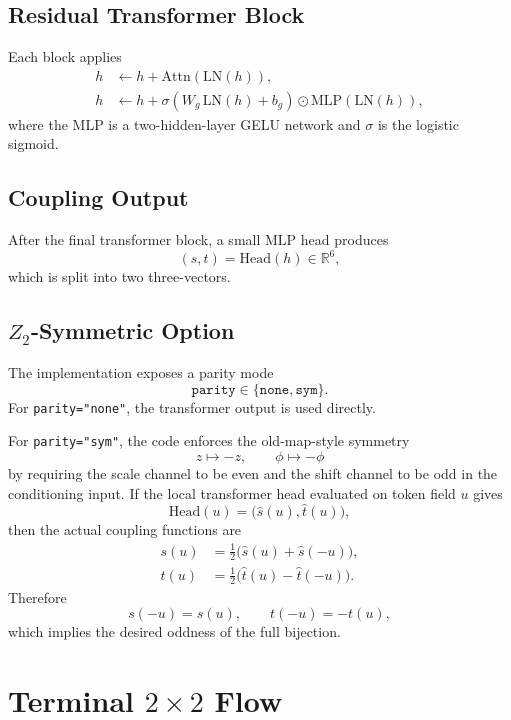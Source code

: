 \documentclass[11pt]{article}
\begin{document}
\subsection{Residual Transformer Block}

Each block applies
\begin{align}
h &\leftarrow h + \mathrm{Attn}(\mathrm{LN}(h)), \\
h &\leftarrow h + \sigma(W_g\,\mathrm{LN}(h)+b_g)\odot
\mathrm{MLP}(\mathrm{LN}(h)),
\end{align}
where the MLP is a two-hidden-layer GELU network and $\sigma$ is the logistic
sigmoid.

\subsection{Coupling Output}

After the final transformer block, a small MLP head produces
\begin{equation}
(s,t)=\mathrm{Head}(h)\in\mathbb{R}^6,
\end{equation}
which is split into two three-vectors.

\subsection{$Z_2$-Symmetric Option}

The implementation exposes a parity mode
\[
\texttt{parity}\in\{\texttt{none},\texttt{sym}\}.
\]
For \texttt{parity="none"}, the transformer output is used directly.

For \texttt{parity="sym"}, the code enforces the old-map-style symmetry
\[
z\mapsto -z,\qquad \phi\mapsto -\phi
\]
by requiring the scale channel to be even and the shift channel to be odd in
the conditioning input. If the local transformer head evaluated on token field
$u$ gives
\[
\mathrm{Head}(u)=\bigl(\hat s(u),\hat t(u)\bigr),
\]
then the actual coupling functions are
\begin{align}
s(u) &= \frac12\bigl(\hat s(u)+\hat s(-u)\bigr), \\
t(u) &= \frac12\bigl(\hat t(u)-\hat t(-u)\bigr).
\end{align}
Therefore
\[
s(-u)=s(u),\qquad t(-u)=-t(u),
\]
which implies the desired oddness of the full bijection.

\section{Terminal $2\times 2$ Flow}
\end{document}
